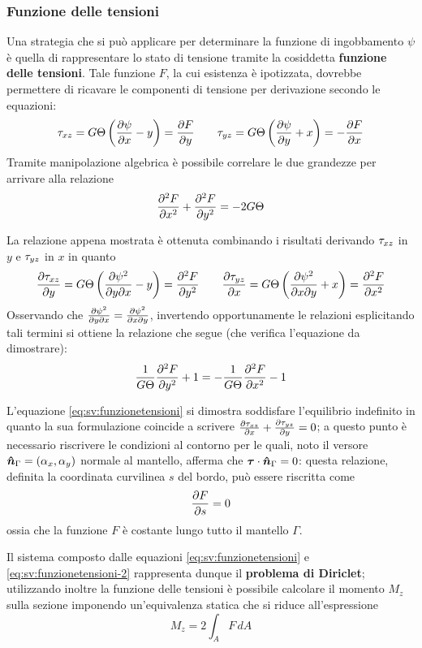     	\subsubsection{Funzione delle tensioni}
    		Una strategia che si può applicare per determinare la funzione di ingobbamento $\psi$ è quella di rappresentare lo stato di tensione tramite la cosiddetta \textbf{funzione delle tensioni}. Tale funzione $F$, la cui esistenza è ipotizzata, dovrebbe permettere di ricavare le componenti di tensione per derivazione secondo le equazioni:
    		\[ \tau_{xz} = G\Theta\left(\frac{\partial \psi}{\partial x} - y\right) = \frac{\partial F}{\partial y} \qquad \tau_{yz} = G\Theta \left(\frac{\partial \psi}{\partial y} +x \right) = -\frac{\partial F}{\partial x}\]
    		Tramite manipolazione algebrica è possibile correlare le due grandezze per arrivare alla relazione
    		\begin{equation}\label{eq:sv:funzionetensioni}
    			\frac{\partial ^2F}{\partial x^2} + \frac{\partial ^2F}{\partial y^2} = -2G\Theta 
    		\end{equation}
    		\begin{dimostrazione}
    			La relazione appena mostrata è ottenuta combinando i risultati derivando $\tau_{xz}$ in $y$ e $\tau_{yz}$ in $x$ in quanto
    			\[ \frac{\partial \tau_{xz}}{\partial y} = G\Theta\left(\frac{\partial \psi^2}{\partial y \partial x} - y\right) = \frac{\partial ^2F}{\partial y^2} \qquad \frac{\partial \tau_{yz}}{\partial x} = G\Theta\left(\frac{\partial \psi^2}{\partial x \partial y} +x\right) = \frac{\partial ^2F}{\partial x^2}  \]
    			Osservando che $\frac{\partial \psi^2}{\partial y \partial x} = \frac{\partial \psi^2}{\partial x \partial y}$, invertendo opportunamente le relazioni esplicitando tali termini si ottiene la relazione che segue (che verifica l'equazione da dimostrare):
    			\[ \frac 1{G\Theta} \frac{\partial ^2F}{\partial y^2} + 1 = - \frac 1{G\Theta} \frac{\partial ^2F}{\partial x^2} - 1  \]
    		\end{dimostrazione}
    		L'equazione \ref{eq:sv:funzionetensioni} si dimostra  soddisfare l'equilibrio indefinito in quanto la sua formulazione coincide a scrivere $\frac{\partial \tau_{xz}}{\partial x} + \frac{\partial \tau_{yz}}{\partial y} = 0$; a questo punto è necessario riscrivere le condizioni al contorno per le quali, noto il versore $\boldsymbol{\hat{n}}_\Gamma= (\alpha_x,\alpha_y)$ normale al mantello, afferma che $\boldsymbol{\tau} \cdot \boldsymbol{\hat{n}}_\Gamma = 0$: questa relazione, definita la coordinata curvilinea $s$ del bordo, può essere riscritta come
    		\begin{equation} \label{eq:sv:funzionetensioni-2}
    			\frac{\partial F}{\partial s} = 0
    		\end{equation} 
    		ossia che la funzione $F$ è costante lungo tutto il mantello $\Gamma$.
    		
    		Il sistema composto dalle equazioni \ref{eq:sv:funzionetensioni} e \ref{eq:sv:funzionetensioni-2} rappresenta dunque il \textbf{problema di Diriclet}; utilizzando inoltre la funzione delle tensioni è possibile calcolare il momento $M_z$ sulla sezione imponendo un'equivalenza statica che si riduce all'espressione
    		\[ M_z = 2\int_A F\, dA \]
    		
